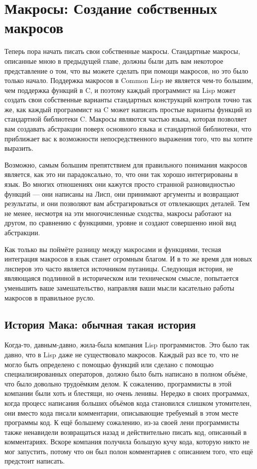 \chapter{Макросы: Создание собственных макросов}
\label{ch:08}

Теперь пора начать писать свои собственные макросы. Стандартные макросы, описанные мною в
предыдущей главе, должны были дать вам некоторое представление о том, что вы можете
сделать при помощи макросов, но это было только начало. Поддержка макросов в Common Lisp
не является чем-то большим, чем поддержка функций в C, и поэтому каждый программист на
Lisp может создать свои собственные варианты стандартных конструкций контроля точно так
же, как каждый программист на C может написать простые варианты функций из стандартной
библиотеки C. Макросы являются частью языка, которая позволяет вам создавать абстракции
поверх основного языка и стандартной библиотеки, что приближает вас к возможности
непосредственного выражения того, что вы хотите выразить.

Возможно, самым большим препятствием для правильного понимания макросов является, как это
ни парадоксально, то, что они так хорошо интегрированы в язык. Во многих отношениях они
кажутся просто странной разновидностью функций --- они написаны на Лисп, они принимают
аргументы и возвращают результаты, и они позволяют вам абстрагироваться от отвлекающих
деталей. Тем не менее, несмотря на эти многочисленные сходства, макросы работают на
другом, по сравнению с функциями, уровне и создают совершенно иной вид абстракции.

Как только вы поймёте разницу между макросами и функциями, тесная интеграция макросов в
язык станет огромным благом. И в то же время для новых лисперов это часто является
источником путаницы. Следующая история, не являющаяся подлинной в историческом или
техническом смысле, попытается уменьшить ваше замешательство, направляя ваши мысли
касательно работы макросов в правильное русло.

\section{История Мака: обычная такая история}

Когда-то, давным-давно, жила-была компания Lisp программистов. Это было так давно, что в
Lisp даже не существовало макросов. Каждый раз все то, что не могло быть определено с
помощью функций или сделано с помощью специализированных операторов, должно было быть
написано в полном объёме, что было довольно трудоёмким делом. К сожалению, программисты в
этой компании были хоть и блестящи, но очень ленивы. Нередко в своих программах, когда
процесс написания больших объёмов кода становился слишком утомителен, они вместо кода
писали комментарии, описывающие требуемый в этом месте программы код. К ещё большему
сожалению, из-за своей лени программисты также ненавидели возвращаться назад и
действительно писать код, описанный в комментариях. Вскоре компания получила большую кучу
кода, которую никто не мог запустить, потому что он был полон комментариев с описанием
того, что ещё предстоит написать.

